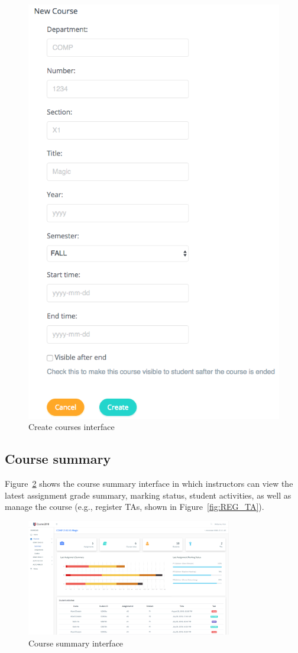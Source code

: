 \begin{figure}[ht]
    \centering
        \includegraphics[width=.6\textwidth]{figures/create-courses}
    \caption{Create courses interface}
    \label{fig:NEW_COURSE}
\end{figure}

\subsection{Course summary}
Figure~\ref{fig:COURSE_SUMMARY} shows the course summary interface in which
instructors can view the latest assignment grade summary, marking status,
student activities, as well as manage the course (e.g., register TAs, shown
in Figure~\ref{fig:REG_TA}).

\begin{figure}[ht]
    \centering
        \includegraphics[width=0.8\textwidth]{figures/course-summary}
    \caption{Course summary interface}
    \label{fig:COURSE_SUMMARY}
\end{figure}

